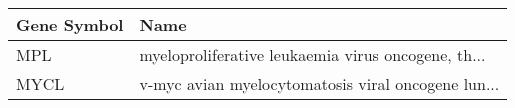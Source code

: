 \begin{tabular}{ll}
\toprule
Gene Symbol &                                               Name \\
\midrule
        MPL & myeloproliferative leukaemia virus oncogene, th... \\
       MYCL & v-myc avian myelocytomatosis viral oncogene lun... \\
\bottomrule
\end{tabular}
